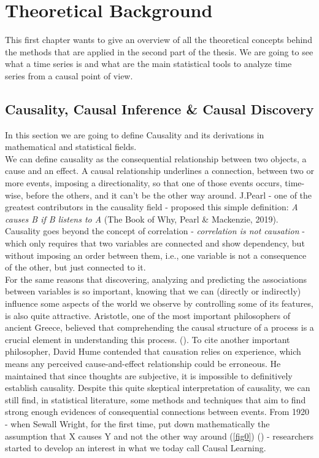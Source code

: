 \chapter{Theoretical Background}\label{Theoretical Background}
This first chapter wants to give an overview of all the theoretical concepts behind the methods that are applied in the second part of the thesis.
We are going to see what a time series is and what are the main statistical tools to analyze time series from a causal point of view.


\section{Causality, Causal Inference \& Causal Discovery}
In this section we are going to define Causality and its derivations in mathematical and statistical fields.\\

We can define causality as the consequential relationship between two objects, a cause and an effect. A causal relationship underlines a connection, between two or more events, imposing a directionality, so that one of those events occurs, time-wise, before the others, and it can't be the other way around. J.Pearl - one of the greatest contributors in the causality field - proposed this simple definition: \textit{A causes B if B listens to A} (The Book of Why, Pearl \& Mackenzie, 2019). \\

Causality goes beyond the concept of correlation - \textit{correlation is not causation} - which only requires that two variables are connected and show dependency, but without imposing an order between them, i.e., one variable is not a consequence of the other, but just connected to it.\\
For the same reasons that discovering, analyzing and predicting the associations between variables is so important, knowing that we can (directly or indirectly) influence some aspects of the world we observe by controlling some of its features, is also quite attractive.
Aristotle, one of the most important philosophers of ancient Greece, believed that comprehending the causal structure of a process is a crucial element in understanding this process. (\cite{molak2023causal}). To cite another important philosopher, David Hume contended that causation relies on experience, which means any perceived cause-and-effect relationship could be erroneous. He maintained that since thoughts are subjective, it is impossible to definitively establish causality. Despite this quite skeptical interpretation of causality, we can still find, in statistical literature, some methods and techniques that aim to find strong enough evidences of consequential connections between events. From 1920 - when Sewall Wright, for the first time, put down mathematically the assumption that X causes Y and not the other way around (\ref{fig0}) (\cite{pearl2022causal}) - researchers started to develop an interest in what we today call Causal Learning. \\

